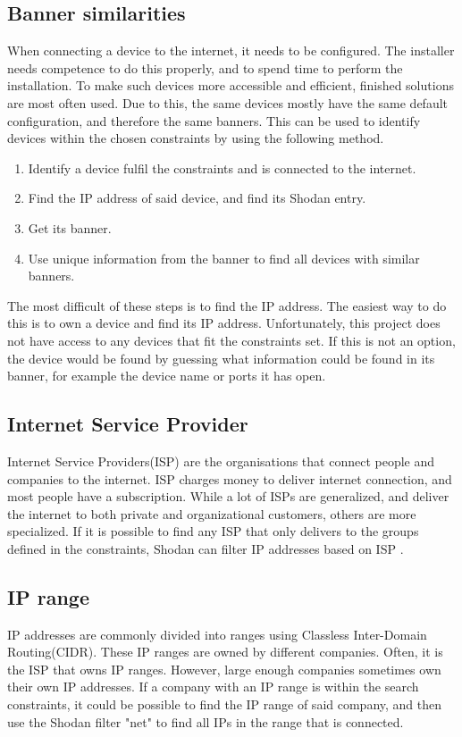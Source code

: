 \subsection{Banner similarities}
When connecting a device to the internet, it needs to be configured. The installer needs competence to do this properly, and to spend time to perform the installation. To make such devices more accessible and efficient, finished solutions are most often used. Due to this, the same devices mostly have the same default configuration, and therefore the same banners. This can be used to identify devices within the chosen constraints by using the following method.
\begin{enumerate}
    \item Identify a device fulfil the constraints and is connected to the internet.
    \item Find the IP address of said device, and find its Shodan entry.
    \item Get its banner.
    \item Use unique information from the banner to find all devices with similar banners.
\end{enumerate}
The most difficult of these steps is to find the IP address. The easiest way to do this is to own a device and find its IP address. Unfortunately, this project does not have access to any devices that fit the constraints set.
If this is not an option, the device would be found by guessing what information could be found in its banner, for example the device name or ports it has open.

\subsection{Internet Service Provider}
Internet Service Providers(ISP) are the organisations that connect people and companies to the internet. ISP charges money to deliver internet connection, and most people have a subscription. While a lot of ISPs are generalized, and deliver the internet to both private and organizational customers, others are more specialized. If it is possible to find any ISP that only delivers to the groups defined in the constraints, Shodan can filter IP addresses based on ISP .

\subsection{IP range}
IP addresses are commonly divided into ranges using Classless Inter-Domain Routing(CIDR). These IP ranges are owned by different companies. Often, it is the ISP that owns IP ranges. However, large enough companies sometimes own their own IP addresses. If a company with an IP range is within the search constraints, it could be possible to find the IP range of said company, and then use the Shodan filter "net" to find all IPs in the range that is connected.


